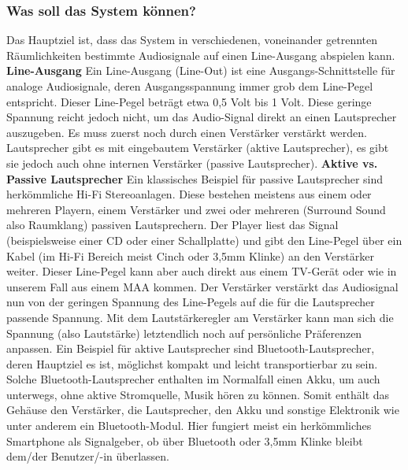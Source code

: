 \documentclass[11pt, twoside]{article}
\begin{document}
\subsubsection{Was soll das System können?}
Das Hauptziel ist, dass das System in verschiedenen, voneinander getrennten Räumlichkeiten bestimmte Audiosignale auf einen Line-Ausgang abspielen kann.
\vspace{4mm}\newline
\textbf{Line-Ausgang}\newline
Ein Line-Ausgang (Line-Out) ist eine Ausgangs-Schnittstelle für analoge Audiosignale, deren Ausgangsspannung immer grob dem Line-Pegel entspricht. Dieser \glqq Line-Pegel beträgt etwa 0,5 Volt bis 1 Volt\grqq{}. \newline
Diese geringe Spannung reicht jedoch nicht, um das Audio-Signal direkt an einen Lautsprecher auszugeben. Es muss zuerst noch durch einen Verstärker verstärkt werden. Lautsprecher gibt es mit eingebautem Verstärker (aktive Lautsprecher), es gibt sie jedoch auch ohne internen Verstärker (passive Lautsprecher).
\vspace{4mm}\newline
\parencite[vgl.][]{noauthor_urlnl01_nodate}
\vspace{4mm}\newline
\textbf{Aktive vs. Passive Lautsprecher}\newline
Ein klassisches Beispiel für passive Lautsprecher sind herkömmliche Hi-Fi Stereoanlagen. Diese bestehen meistens aus einem oder mehreren Playern, einem Verstärker und zwei oder mehreren (Surround Sound also Raumklang) passiven Lautsprechern. Der Player liest das Signal (beispielsweise einer CD oder einer Schallplatte) und gibt den Line-Pegel über ein Kabel (im Hi-Fi Bereich meist Cinch oder 3,5mm Klinke) an den Verstärker weiter. Dieser Line-Pegel kann aber auch direkt aus einem TV-Gerät oder wie in unserem Fall aus einem MAA kommen. Der Verstärker verstärkt das Audiosignal nun von der geringen Spannung des Line-Pegels auf die für die Lautsprecher passende Spannung. Mit dem Lautstärkeregler am Verstärker kann man sich die Spannung (also Lautstärke) letztendlich noch auf persönliche Präferenzen anpassen. \newline
Ein Beispiel für aktive Lautsprecher sind Bluetooth-Lautsprecher, deren Hauptziel es ist, möglichst kompakt und leicht transportierbar zu sein. Solche Bluetooth-Lautsprecher enthalten im Normalfall einen Akku, um auch unterwegs, ohne aktive Stromquelle, Musik hören zu können. Somit enthält das Gehäuse den Verstärker, die Lautsprecher, den Akku und sonstige Elektronik wie unter anderem ein Bluetooth-Modul. Hier fungiert meist ein herkömmliches Smartphone als Signalgeber, ob über Bluetooth oder 3,5mm Klinke bleibt dem/der Benutzer/-in überlassen.\newline
\end{document}
